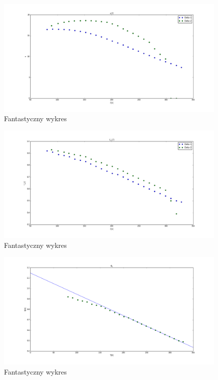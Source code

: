 \documentclass[a4paper,12pt]{article}
\begin{document}
\begin{figure} [H]
  \begin{center}
    \includegraphics[width = 15cm]{probki_porownanie_eta.png}
    \caption{Fantastyczny wykres}
  \end{center}
\end{figure}

\begin{figure} [H]
  \begin{center}
    \includegraphics[width = 15cm]{probki_porownanie_V_oc.png}
    \caption{Fantastyczny wykres}
  \end{center}
\end{figure}

\begin{figure} [H]
  \begin{center}
    \includegraphics[width = 15cm]{probka1_phi_b.png}
    \caption{Fantastyczny wykres}
  \end{center}
\end{figure}
\end{document}

